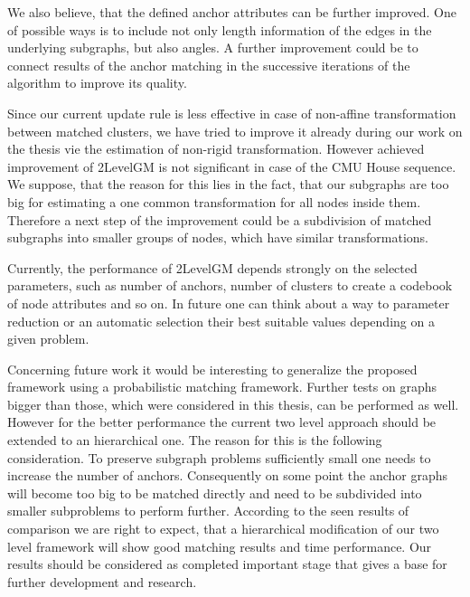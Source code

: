 We also believe, that the defined anchor attributes can be further improved. One of possible ways is to include not only length information of the edges in the underlying subgraphs, but also angles. A further improvement could be to connect results of the anchor matching in the successive iterations of the algorithm to improve its quality.

Since our current update rule is less effective in case of non-affine transformation between matched clusters, we have tried to improve it already during our work on the thesis vie the estimation of non-rigid transformation. However achieved improvement of 2LevelGM is not significant in case of the CMU House sequence. We suppose, that the reason for this lies in the fact, that our subgraphs are too big for estimating a one common transformation for all nodes inside them. Therefore a next step of the improvement could be a subdivision of matched subgraphs into smaller groups of nodes, which have similar transformations.

Currently, the performance of 2LevelGM depends strongly on the selected parameters, such as number of anchors, number of clusters to create a codebook of node attributes and so on. In future one can think about a way to parameter reduction or an automatic selection their best suitable values depending on a given problem. %

Concerning future work it would be interesting to generalize the proposed framework using a probabilistic matching framework. Further tests on graphs bigger than those, which were considered in this thesis, can be performed as well. However for the better performance the current two level approach should be extended to an hierarchical one. The reason for this is the following consideration. To preserve subgraph problems sufficiently small one needs to increase the number of anchors. Consequently on some point the anchor graphs will become too big to be matched directly and need to be subdivided into smaller subproblems to perform further. According to the seen results of comparison we are right to expect, that a hierarchical modification of our two level framework will show good matching results and time performance. 
Our results should be considered as completed important stage that gives a base for further development and research.

 
